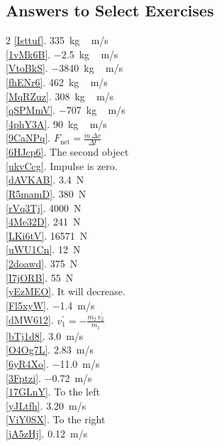 \documentclass{article}
\numberwithin{equation}{section}
\numberwithin{figure}{section}
\begin{document}
\clearpage
\subsection{Answers to Select Exercises}

\begin{multicols}{2}
\ref{Isttuf}. \SI{335}{kg\,m/s}\\
\ref{1vMk6B}. \SI{-2.5}{kg\,m/s}\\
\ref{VtoBkS}. \SI{-3840}{kg\,m/s}\\
\ref{fhENr6}. \SI{462}{kg\,m/s}\\
\ref{MqRZuz}. \SI{308}{kg\,m/s}\\
\ref{qSPMmV}. \SI{-707}{kg\,m/s}\\
\ref{4phY3A}. \SI{90}{kg\,m/s}\\
\ref{9CaNPq}. $F_{\text{net}} = \frac{m\,\Delta v}{\Delta t}$\\
\ref{6HJcp6}. The second object\\
\ref{ukvCcg}. Impulse is zero.\\
\ref{dAVKAB}. \SI{3.4}{N}\\
\ref{R5mamD}. \SI{380}{N}\\
\ref{rVq3Tj}. \SI{4000}{N}\\
\ref{4Me32D}. \SI{241}{N}\\
\ref{LKi6tV}. \SI{16571}{N}\\
\ref{uWU1Cn}. \SI{12}{N}\\
\ref{2doawd}. \SI{375}{N}\\
\ref{I7jORB}. \SI{55}{N}\\
\ref{yEzMEO}. It will decrease.\\
\ref{Fl5xyW}. \SI{-1.4}{m/s}\\
\ref{dMW612}. $v_1^{\prime} = -\frac{m_2\,v_2^{\prime}}{m_1}$\\
\ref{bTj1d8}. \SI{3.0}{m/s}\\
\ref{O4Og7L}. \SI{2.83}{m/s}\\
\ref{6yR4Xo}. \SI{-11.0}{m/s}\\
\ref{3Fptzi}. \SI{-0.72}{m/s}\\
\ref{17GLnY}. To the left\\
\ref{yJLtfh}. \SI{3.20}{m/s}\\
\ref{ViY0SX}. To the right\\
\ref{jA5zHj}. \SI{0.12}{m/s}\\
\end{multicols}
\end{document}
